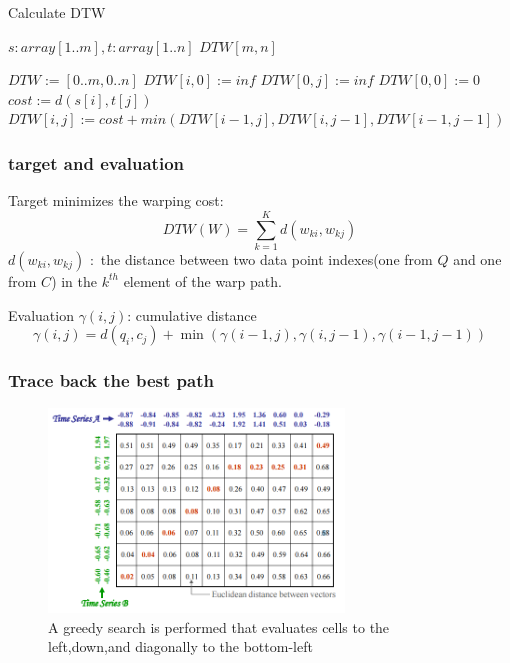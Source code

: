 \documentclass[xetex,mathserif,serif]{beamer}
\begin{document}
\begin{algorithm}
\caption{Calculate DTW}
\begin{algorithmic}[1]
\small
\REQUIRE $s:array[1..m], t:array[1..n]$
\ENSURE $DTW[m,n]$

\STATE $DTW := [0..m,0..n]$
\STATE $DTW[i,0] := inf$
\ENDFOR
{}
\STATE $DTW[0,j] := inf$
\ENDFOR
\STATE $DTW[0,0] := 0$
\STATE
{}
\STATE $cost:=d(s[i],t[j])$
\STATE $DTW[i,j]:=cost+min(DTW[i-1,j],DTW[i,j-1],DTW[i-1,j-1])$
\ENDFOR
\ENDFOR
\end{algorithmic}
\end{algorithm}

\begin{frame}
\frametitle{target and evaluation}
\begin{block}{Target}
minimizes the warping cost:
\[DTW\left( W \right) = \sum\limits_{k = 1}^K {d\left( {{w_{ki}},{w_{kj}}} \right)} \]
${d\left( {{w_{ki}},{w_{kj}}} \right)}$ :\  the distance between two data point indexes(one from $Q$ and one from $C$) in the $k^{th}$ element of the warp path.
\end{block}

\begin{block}{Evaluation}
$\gamma(i,j)$: cumulative distance
\[\gamma \left( {i,j} \right) = d\left( {{q_i},{c_j}} \right) + \min \left( {\gamma \left( {i - 1,j} \right),\gamma \left( {i,j - 1} \right),\gamma \left( {i - 1,j - 1} \right)} \right)\]
\end{block}
\end{frame}

\begin{frame}
\frametitle{Trace back the best path}
\begin{figure}
  \centering
  \includegraphics[width=0.7\textwidth]{trace_back.png}
  \caption{\centering A greedy search is performed that evaluates cells to the left,down,and diagonally to the bottom-left}\label{fig:3}
\end{figure}
\end{frame}
\end{document}
